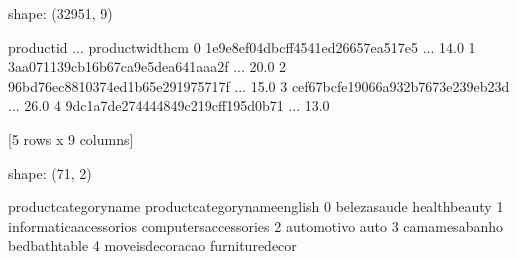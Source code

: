 \documentclass[letterpaper,10pt,english]{jupyterBook}
\begin{document}
\begin{sphinxVerbatim}[commandchars=\\\{\}]
shape: (32951, 9)
\end{sphinxVerbatim}

\begin{sphinxVerbatim}[commandchars=\\\{\}]
                         product\PYGZus{}id  ... product\PYGZus{}width\PYGZus{}cm
0  1e9e8ef04dbcff4541ed26657ea517e5  ...             14.0
1  3aa071139cb16b67ca9e5dea641aaa2f  ...             20.0
2  96bd76ec8810374ed1b65e291975717f  ...             15.0
3  cef67bcfe19066a932b7673e239eb23d  ...             26.0
4  9dc1a7de274444849c219cff195d0b71  ...             13.0

[5 rows x 9 columns]
\end{sphinxVerbatim}

\begin{sphinxVerbatim}[commandchars=\\\{\}]
  
  
\end{sphinxVerbatim}

\begin{sphinxVerbatim}[commandchars=\\\{\}]
shape: (71, 2)
\end{sphinxVerbatim}

\begin{sphinxVerbatim}[commandchars=\\\{\}]
    product\PYGZus{}category\PYGZus{}name product\PYGZus{}category\PYGZus{}name\PYGZus{}english
0            beleza\PYGZus{}saude                 health\PYGZus{}beauty
1  informatica\PYGZus{}acessorios         computers\PYGZus{}accessories
2              automotivo                          auto
3         cama\PYGZus{}mesa\PYGZus{}banho                bed\PYGZus{}bath\PYGZus{}table
4        moveis\PYGZus{}decoracao               furniture\PYGZus{}decor
\end{sphinxVerbatim}

\begin{sphinxVerbatim}[commandchars=\\\{\}]
  
  
\end{sphinxVerbatim}
\end{document}
